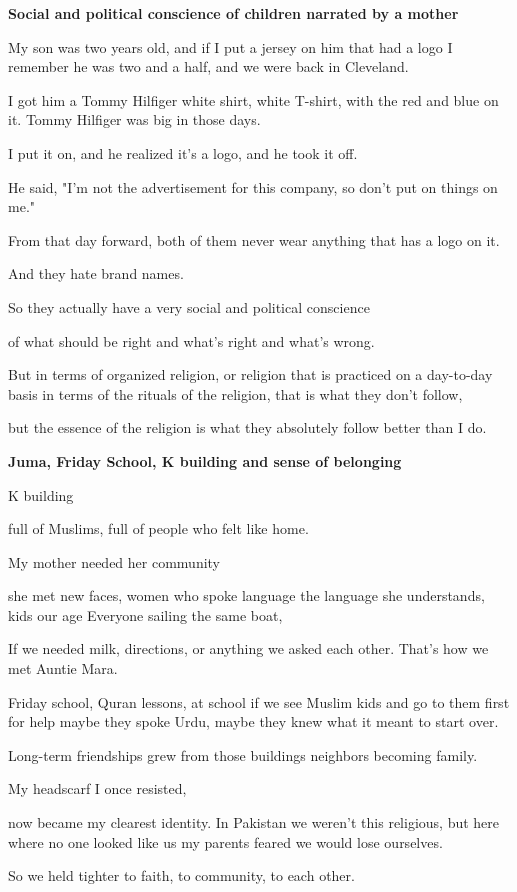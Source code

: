 \textbf{Social and political conscience of children narrated by a mother}

\begin{FoundPoem}
My son was two years old,
and if I put a jersey on him
that had a logo
I remember he was two and a half,
and we were back in Cleveland.

I got him
a Tommy Hilfiger white shirt,
white T-shirt,
with the red and blue on it.
Tommy Hilfiger
was big in those days.

I put it on,
and he realized it's a logo,
and he took it off.

He said,
"I'm not the advertisement
for this company,
so don't put on things on me."

From that day forward,
both of them never wear
anything that has a logo on it.

And they hate brand names.

So they actually have
a very social
and political conscience

of what should be right
and what's right
and what's wrong.

But in terms of organized religion,
or religion that is practiced
on a day-to-day basis
in terms of the rituals
of the religion,
that is what they don't follow,

but the essence of the religion
is what they absolutely follow
better than I do.
\end{FoundPoem}

\textbf{Juma, Friday School, K building and sense of belonging}

\begin{FoundPoem}
K building

full of Muslims,
full of people who felt
like home.

My mother needed her community

she met new faces,
women who spoke language the language she understands,
kids our age
Everyone sailing the same boat,

If we needed milk,
directions,
or anything
we asked each other.
That’s how we met Auntie Mara.

Friday school,
Quran lessons,
at school if we see Muslim kids
and go to them first for help
maybe they spoke Urdu,
maybe they knew
what it meant to start over.

Long-term friendships grew
from those buildings
neighbors becoming family.

My headscarf I once resisted,

 now
became my clearest identity.
In Pakistan we weren’t this religious,
 but here
  where no one looked like us
  my parents feared
  we would lose ourselves.
  
So we held tighter
to faith,
to community,
to each other.
\end{FoundPoem}

